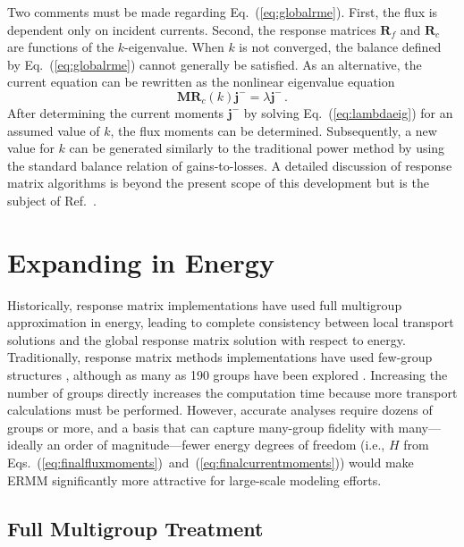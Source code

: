 \documentclass[5p,times,twocolumn,10pt]{elsarticle}
\newcommand{\EQ}[1]{Eq.~(\ref{#1})}               %
\newcommand{\EQSTWO}[2]{Eqs.~(\ref{#1})~and~(\ref{#2})}
\newcommand{\REF}[1]{Ref.~\citen{#1}}               %
\begin{document}
    Two comments must be made regarding \EQ{eq:globalrme}.  First, the flux is 
    dependent only on incident currents. Second, the response matrices 
    $\mathbf{R}_{f}$ and $\mathbf{R}_{c}$ are functions of the $k$-eigenvalue.  
    When $k$ is not converged, the balance defined by \EQ{eq:globalrme} cannot 
    generally be satisfied. As an alternative, the current equation can be 
    rewritten as the nonlinear eigenvalue equation
    \begin{equation}
        \mathbf{MR}_{c}(k)   \mathbf{j}^- = \lambda \mathbf{j}^- \, .
        \label{eq:lambdaeig}
    \end{equation}
    After determining the current moments $\mathbf{j}^-$ by solving 
    \EQ{eq:lambdaeig} for an assumed value of $k$, the flux moments can be 
    determined. Subsequently, a new value for $k$ can be generated similarly to 
    the traditional power method by using the standard balance relation of 
    gains-to-losses. A detailed discussion of response matrix algorithms is 
    beyond the present scope of this development but is the subject of 
    \REF{RobertsSerment}. 
    
    \section{Expanding in Energy}
    \label{sec:energy_expansion}
    
    Historically, response matrix implementations have used full multigroup
    approximation in energy, leading to complete consistency between local 
    transport solutions and the global response matrix solution with respect 
    to energy. Traditionally, response matrix methods implementations have used 
    few-group structures \cite{ishii2009tdd, forget2006tdh}, although as many 
    as 190 groups have been explored \cite{forget2004hcm}.  Increasing 
    the number of groups directly increases the computation time because 
    more transport calculations must be performed.  However, 
    accurate analyses require dozens of groups or more, and a basis that can 
    capture many-group fidelity with many---ideally an order of 
    magnitude---fewer energy degrees of freedom (i.e., $H$ from 
    \EQSTWO{eq:finalfluxmoments}{eq:finalcurrentmoments}) would make ERMM 
    significantly more attractive for large-scale modeling efforts.  
    
    \subsection{Full Multigroup Treatment}
    
\end{document}
